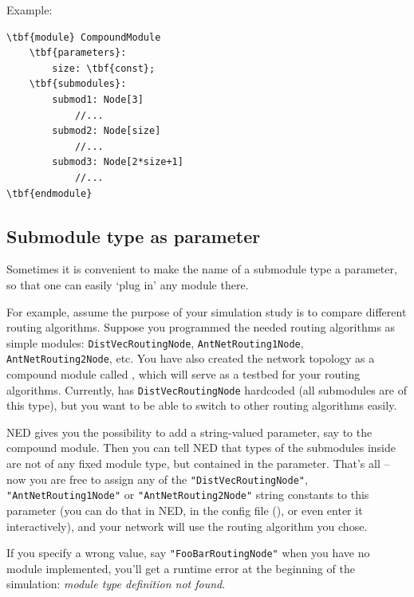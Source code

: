 Example:

\begin{Verbatim}[commandchars=\\\{\}]
\tbf{module} CompoundModule
    \tbf{parameters}:
        size: \tbf{const};
    \tbf{submodules}:
        submod1: Node[3]
            //...
        submod2: Node[size]
            //...
        submod3: Node[2*size+1]
            //...
\tbf{endmodule}
\end{Verbatim}



\subsection{Submodule type as parameter}
\label{sec:ch-ned-lang:like}

Sometimes it is convenient to make the name of a submodule type a parameter,
so that one can easily `plug in' any module there.

For example, assume the purpose of your simulation study is
to compare different routing algorithms. Suppose you programmed
the needed routing algorithms as simple modules: \texttt{DistVecRoutingNode},
\texttt{AntNetRouting1Node}, \texttt{AntNetRouting2Node}, etc.
You have also created the network topology as a compound module
called , which will serve as a testbed for your routing
algorithms. Currently,  has \texttt{DistVecRoutingNode}
hardcoded (all submodules are of this type), but you want
to be able to switch to other routing algorithms easily.

NED gives you the possibility to add a string-valued parameter,
say  to the  compound module.
Then you can tell NED that types of the submodules inside 
are not of any fixed module type, but contained in the 
parameter. That's all -- now you are free to assign any of
the \texttt{"DistVecRoutingNode"}, \texttt{"AntNetRouting1Node"} or
\texttt{"AntNetRouting2Node"} string constants to this parameter
(you can do that in NED, in the config file (),
or even enter it interactively),
and your network will use the routing algorithm you chose.

If you specify a wrong value, say \texttt{"FooBarRoutingNode"}
when you have no  module implemented,
you'll get a runtime error at the beginning of the simulation:
\textit{module type definition not found}.

